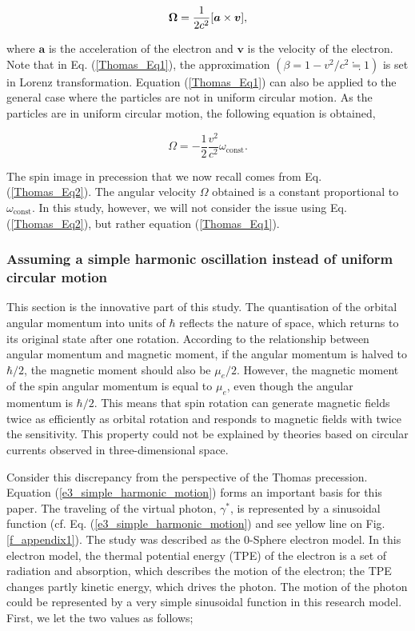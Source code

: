 \documentclass[%
 reprint,
 amsmath,amssymb,
 aps,
]{revtex4-1}
\numberwithin{equation}{section}%
\begin{document}
\begin{equation}
    {\bf \Omega}=\frac{1}{2 c^2}[{\boldsymbol a} \times {\boldsymbol v}],
    \label{Thomas_Eq1}
\end{equation}

\noindent where ${\boldsymbol a}$ is the acceleration of the electron and ${\boldsymbol v}$ is the velocity of the electron. Note that in Eq. (\ref{Thomas_Eq1}), the approximation $(\beta = 1 - v^2/c^2 \fallingdotseq 1)$ is set in Lorenz transformation. Equation (\ref{Thomas_Eq1}) can also be applied to the general case where the particles are not in uniform circular motion. As the particles are in uniform circular motion, the following equation is obtained,

\begin{equation}
    {\Omega}= - \frac{1}{2} \frac{v^2}{c^2} \omega_{\mathrm{const}}.
    \label{Thomas_Eq2}
\end{equation}

The spin image in precession that we now recall comes from Eq. (\ref{Thomas_Eq2}). The angular velocity $\Omega$ obtained is a constant proportional to $\omega_{\mathrm{const}}$. In this study, however, we will not consider the issue using Eq. (\ref{Thomas_Eq2}), but rather equation (\ref{Thomas_Eq1}).


\subsubsection{\label{sec:Assuming a simple}Assuming a simple harmonic oscillation instead of uniform circular motion}

This section is the innovative part of this study. The quantisation of the orbital angular momentum into units of $\hbar$ reflects the nature of space, which returns to its original state after one rotation. According to the relationship between angular momentum and magnetic moment, if the angular momentum is halved to $\hbar/2$, the magnetic moment should also be $\mu_e/2$. However, the magnetic moment of the spin angular momentum is equal to $\mu_e$, even though the angular momentum is $\hbar/2$. This means that spin rotation can generate magnetic fields twice as efficiently as orbital rotation and responds to magnetic fields with twice the sensitivity. This property could not be explained by theories based on circular currents observed in three-dimensional space.

Consider this discrepancy from the perspective of the Thomas precession. Equation (\ref{e3_simple_harmonic_motion}) forms an important basis for this paper. The traveling of the virtual photon, ${\gamma^{*}}$, is represented by a sinusoidal function (cf. Eq. (\ref{e3_simple_harmonic_motion}) and see yellow line on Fig. \ref{f_appendix1}). The study was described as the 0-Sphere electron model. In this electron model, the thermal potential  energy (TPE) of the electron is a set of radiation and absorption, which describes the motion of the electron; the TPE changes partly kinetic energy, which drives the photon. The motion of the photon could be represented by a very simple sinusoidal function in this research model. First, we let the two values as follows;
\end{document}

